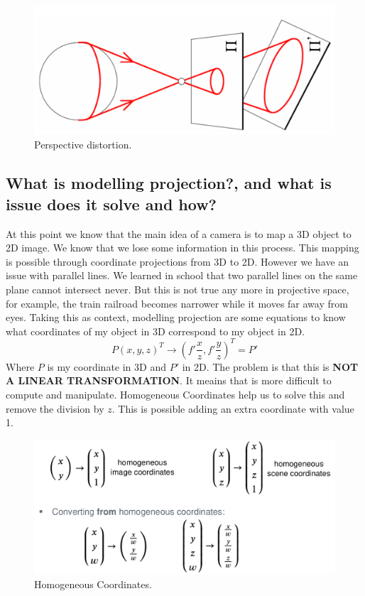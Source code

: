 \documentclass{article}
\begin{document}
\begin{figure}[H]
\centering
\includegraphics[scale=0.2]{pdist.png}
\caption{Perspective distortion.}
\label{fig:img2}
\end{figure}

\subsection{What is modelling projection?, and what is issue does it solve and how?}
At this point we know that the main idea of a camera is to map a 3D object to 2D image. We
know that we lose some information in this process. This mapping is possible through coordinate
projections from 3D to 2D. However we have an issue with parallel lines. We learned in school
that two parallel lines on the same plane cannot intersect never. But this is not true any more
in projective space, for example, the train railroad  becomes narrower while it moves far away
from eyes.
Taking this as context, modelling projection are some equations to know what coordinates of my object
in 3D correspond to my object in 2D.
\[P(x, y, z)^T \rightarrow (f'\frac{x}{z}, f'\frac{y}{z})^T=P'\]
Where \(P\) is my coordinate in 3D and \(P'\) in 2D. The problem is that this is \textbf{NOT A LINEAR
TRANSFORMATION}. It meains that is more difficult to compute and manipulate. Homogeneous Coordinates help
us to solve this and remove the division by \(z\). This is possible adding an extra coordinate with
value 1.

\begin{figure}[H]
\centering
\includegraphics[scale=0.2]{homocoord.png}
\caption{Homogeneous Coordinates.}
\label{fig:img2}
\end{figure}
\end{document}
